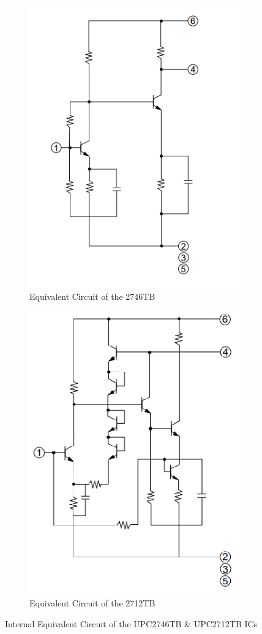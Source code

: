 \begin{figure}[H]
	\setlength{\unitlength}{\textwidth} 
	\centering
	\begin{subfigure}{.5\textwidth}
  		\centering
  		\includegraphics[width=0.3\unitlength]{2746_cct}
  		\caption{\label{fig:2746top}Equivalent Circuit of the 2746TB}
	\end{subfigure}%
	\begin{subfigure}{.5\textwidth}
  		\centering
		\includegraphics[width=0.3\unitlength]{2712_cct}
  		\caption{\label{fig:2712top}Equivalent Circuit of the 2712TB}
	\end{subfigure}
\caption{\label{fig:274612top} Internal Equivalent Circuit of the UPC2746TB \& UPC2712TB ICs   }
\end{figure}	




